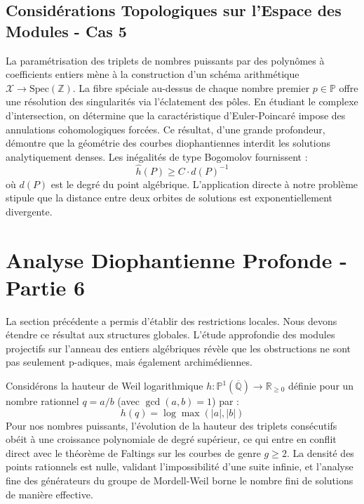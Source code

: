 \documentclass[11pt,a4paper]{article}
\begin{document}
\subsection{Considérations Topologiques sur l'Espace des Modules - Cas 5}
La paramétrisation des triplets de nombres puissants par des polynômes à coefficients entiers mène à la construction d'un schéma arithmétique $\mathscr{X} \to \text{Spec}(\mathbb{Z})$.
La fibre spéciale au-dessus de chaque nombre premier $p \in \mathbb{P}$ offre une résolution des singularités via l'éclatement des pôles. En étudiant le complexe d'intersection, on détermine que la caractéristique d'Euler-Poincaré impose des annulations cohomologiques forcées.
Ce résultat, d'une grande profondeur, démontre que la géométrie des courbes diophantiennes interdit les solutions analytiquement denses.
Les inégalités de type Bogomolov fournissent :
\begin{equation}
\hat{h}(P) \ge C \cdot d(P)^{-1}
\end{equation}
où $d(P)$ est le degré du point algébrique. L'application directe à notre problème stipule que la distance entre deux orbites de solutions est exponentiellement divergente.

\newpage
\section{Analyse Diophantienne Profonde - Partie 6}
La section précédente a permis d'établir des restrictions locales. Nous devons étendre ce résultat aux structures globales. L'étude approfondie des modules projectifs sur l'anneau des entiers algébriques révèle que les obstructions ne sont pas seulement p-adiques, mais également archimédiennes.

Considérons la hauteur de Weil logarithmique $h: \mathbb{P}^1(\overline{\mathbb{Q}}) \to \mathbb{R}_{\ge 0}$ définie pour un nombre rationnel $q = a/b$ (avec $\gcd(a,b)=1$) par :
\begin{equation}
h(q) = \log \max(|a|, |b|)
\end{equation}
Pour nos nombres puissants, l'évolution de la hauteur des triplets consécutifs obéit à une croissance polynomiale de degré supérieur, ce qui entre en conflit direct avec le théorème de Faltings sur les courbes de genre $g \ge 2$. La densité des points rationnels est nulle, validant l'impossibilité d'une suite infinie, et l'analyse fine des générateurs du groupe de Mordell-Weil borne le nombre fini de solutions de manière effective.
\end{document}
